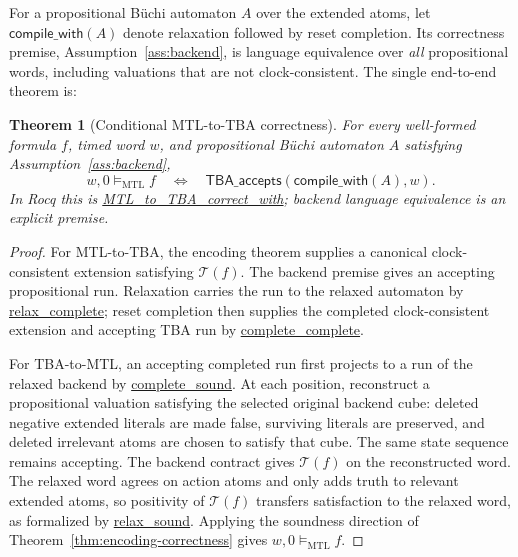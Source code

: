 \documentclass{ieeeaccess}
\newtheorem{theorem}{Theorem}[section]
\newcommand{\satM}{\models_{\mathrm{MTL}}}
\newcommand{\T}{\mathcal{T}}
\newcommand{\Rocqid}[1]{\url{#1}}
\begin{document}
For a propositional B\"uchi automaton $A$ over the extended atoms, let
$\mathsf{compile\_with}(A)$ denote relaxation followed by reset completion.
Its correctness premise, Assumption~\ref{ass:backend}, is language
equivalence over \emph{all} propositional words, including valuations that
are not clock-consistent. The single end-to-end theorem is:
\begin{theorem}[Conditional MTL-to-TBA correctness]
\label{thm:mtl-to-tba-correct}
For every well-formed formula $f$, timed word $w$, and propositional
B\"uchi automaton $A$ satisfying Assumption~\ref{ass:backend},
\[
w,0\satM f
\quad\Longleftrightarrow\quad
\mathsf{TBA\_accepts}(\mathsf{compile\_with}(A),w).
\]
In Rocq this is \Rocqid{MTL_to_TBA_correct_with}; backend language
equivalence is an explicit premise.
\end{theorem}
\begin{proof}
For MTL-to-TBA, the encoding theorem supplies a canonical clock-consistent
extension satisfying $\T(f)$. The backend premise gives an accepting
propositional run. Relaxation carries the run to the relaxed automaton by
\Rocqid{relax_complete}; reset completion then supplies the completed
clock-consistent extension and accepting TBA run by
\Rocqid{complete_complete}.

For TBA-to-MTL, an accepting completed run first projects to a run of the
relaxed backend by \Rocqid{complete_sound}. At each position, reconstruct a
propositional valuation satisfying the selected original backend cube:
deleted negative extended literals are made false, surviving literals are
preserved, and deleted irrelevant atoms are chosen to satisfy that cube. The
same state sequence remains accepting. The backend contract gives
$\T(f)$ on the reconstructed word. The relaxed word agrees on action atoms
and only adds truth to relevant extended atoms, so positivity of $\T(f)$
transfers satisfaction to the relaxed word, as formalized by
\Rocqid{relax_sound}. Applying the soundness direction of
Theorem~\ref{thm:encoding-correctness} gives $w,0\satM f$.
\end{proof}
\end{document}
